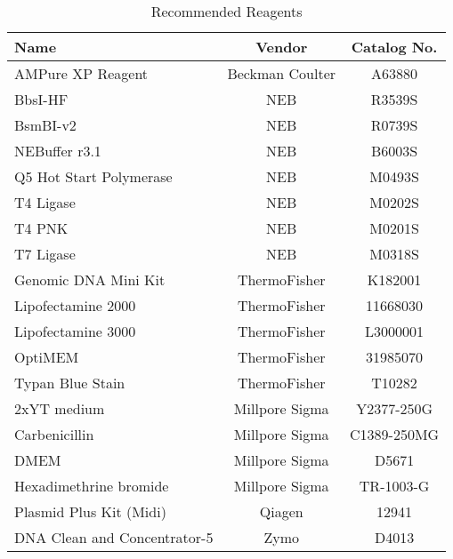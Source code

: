 

\begin{longtable}[]{@{}lcc@{}}
\caption{Recommended Reagents}\label{tab:reagents} \\
\toprule\noalign{}
Name & Vendor & Catalog No. \\
\midrule\noalign{}
\endhead
\bottomrule\noalign{}
\endlastfoot
AMPure XP Reagent & Beckman Coulter & A63880 \\ 
BbsI-HF & NEB & R3539S \\ 
BsmBI-v2 & NEB & R0739S \\ 
NEBuffer r3.1 &  NEB &  B6003S \\ 
Q5 Hot Start Polymerase & NEB & M0493S \\ 
T4 Ligase & NEB & M0202S \\ 
T4 PNK & NEB & M0201S \\ 
T7 Ligase & NEB & M0318S \\ 
Genomic DNA Mini Kit & ThermoFisher & K182001 \\ 
Lipofectamine 2000 & ThermoFisher & 11668030 \\ 
Lipofectamine 3000 & ThermoFisher & L3000001 \\ 
OptiMEM & ThermoFisher & 31985070 \\ 
Typan Blue Stain & ThermoFisher & T10282 \\ 
2xYT medium & Millpore Sigma & Y2377-250G \\ 
Carbenicillin & Millpore Sigma & C1389-250MG \\ 
DMEM &  Millpore Sigma & D5671 \\ 
Hexadimethrine bromide & Millpore Sigma & TR-1003-G \\ 
Plasmid Plus Kit (Midi) & Qiagen & 12941 \\ 
DNA Clean and Concentrator-5 & Zymo & D4013 \\ 

\end{longtable}
